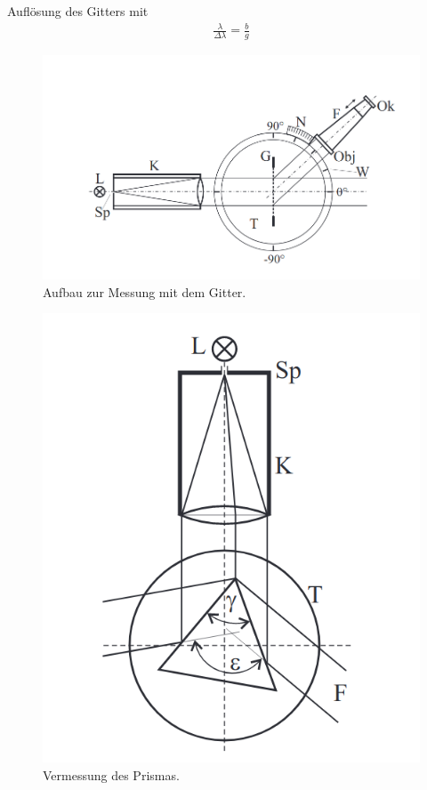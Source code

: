 \documentclass{article}
\begin{document}
Auflösung des Gitters mit 
\begin{align}
\label{eq:aufl_gitter}
\frac{\lambda}{\Delta \lambda} = \frac{b}{g}
\end{align}

\begin{figure}[H]
\centering
\includegraphics[scale=1.5]{gitter.png}
\caption{Aufbau zur Messung mit dem Gitter.}
\label{fig:gitter}
\end{figure}


\begin{figure}[H]
\centering
\includegraphics[scale=1.5]{prisma1.png}
\caption{Vermessung des Prismas.}
\label{fig:prisma}
\end{figure}
\end{document}
